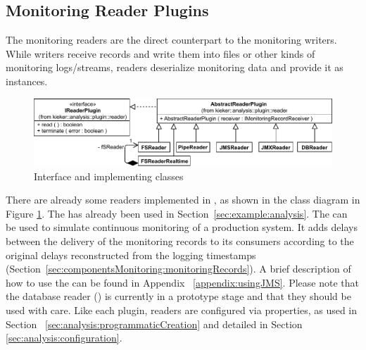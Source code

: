 \subsection{Monitoring Reader Plugins}

The monitoring readers are the direct counterpart to the monitoring %
writers. While writers receive records and write them into files or other kinds %
of monitoring logs/streams, readers deserialize monitoring data and provide it as %
 instances. 

\begin{figure}[h]\centering
\includegraphics[scale=0.7]{images/kieker_readerimplsuserguide-modified}
\caption{Interface  and implementing classes}
\label{Figure:ReaderHierarchy}
\end{figure}


% 
% 


\noindent There are already some readers implemented in \Kieker,  as shown in the %
class diagram in Figure \ref{Figure:ReaderHierarchy}. %
The  has already been used in Section~\ref{sec:example:analysis}. %
The  can be used to simulate continuous monitoring of a %
production system. It adds delays between the delivery of the monitoring records %
to its consumers according to the original delays reconstructed from the logging %
timestamps (Section~\ref{sec:componentsMonitoring:monitoringRecords}).
A brief description of how to use the  can be found in Appendix~%
\ref{appendix:usingJMS}. Please note that the database reader () %
is currently in a prototype stage and that they should be used with care. %
Like each plugin, readers are configured via properties, as used in Section~%
\ref{sec:analysis:programmaticCreation} and detailed in Section~%
\ref{sec:analysis:configuration}. 

